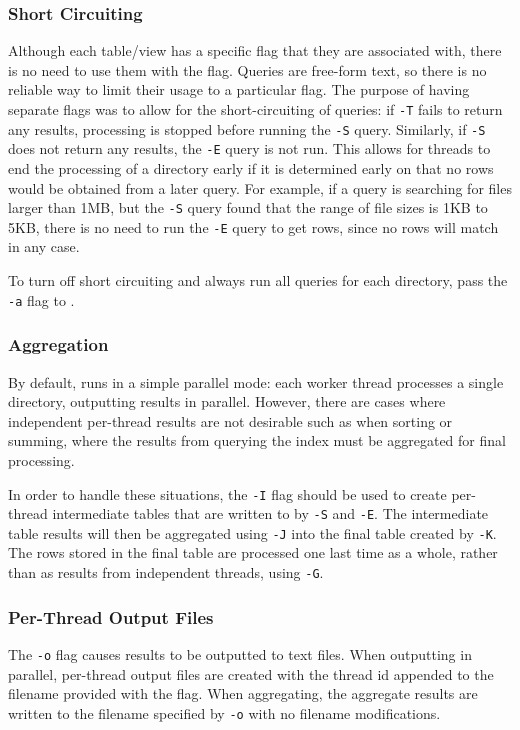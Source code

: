 \subsubsection{Short Circuiting}
Although each table/view has a specific flag that they are associated
with, there is no need to use them with the flag. Queries are
free-form text, so there is no reliable way to limit their usage to a
particular flag. The purpose of having separate flags was to allow for
the short-circuiting of queries: if \texttt{-T} fails to return any
results, processing is stopped before running the \texttt{-S}
query. Similarly, if \texttt{-S} does not return any results, the
\texttt{-E} query is not run. This allows for threads to end the
processing of a directory early if it is determined early on that no
rows would be obtained from a later query. For example, if a query is
searching for files larger than 1MB, but the \texttt{-S} query found
that the range of file sizes is 1KB to 5KB, there is no need to run
the \texttt{-E} query to get rows, since no rows will match in any
case.

To turn off short circuiting and always run all queries for each
directory, pass the \texttt{-a} flag to \gufiquery.

\subsubsection{Aggregation}
By default, \gufiquery runs in a simple parallel mode: each worker
thread processes a single directory, outputting results in
parallel. However, there are cases where independent per-thread
results are not desirable such as when sorting or summing, where the
results from querying the index must be aggregated for final
processing.

In order to handle these situations, the \texttt{-I} flag should be
used to create per-thread intermediate tables that are written to by
\texttt{-S} and \texttt{-E}. The intermediate table results will then
be aggregated using \texttt{-J} into the final table created by
\texttt{-K}. The rows stored in the final table are processed one last
time as a whole, rather than as results from independent threads,
using \texttt{-G}.

\subsubsection{Per-Thread Output Files}
The \texttt{-o} flag causes results to be outputted to text
files. When outputting in parallel, per-thread output files are
created with the thread id appended to the filename provided with the
flag. When aggregating, the aggregate results are written to the
filename specified by \texttt{-o} with no filename modifications.

